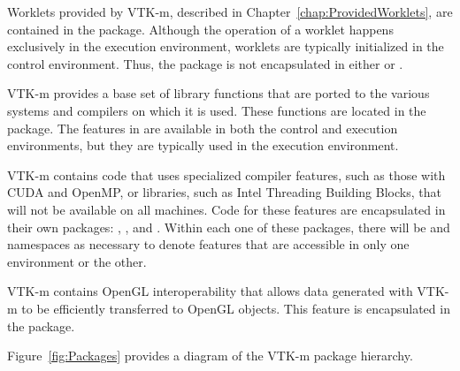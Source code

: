 
Worklets provided by VTK-m, described in
Chapter~\ref{chap:ProvidedWorklets}, are contained in the \vtkmworklet{}
package. Although the operation of a worklet happens exclusively in the
execution environment, worklets are typically initialized in the control
environment. Thus, the \vtkmworklet{} package is not encapsulated in either
\vtkmcont{} or \vtkmexec{}.

VTK-m provides a base set of library functions that are ported to
the various systems and compilers on which it is used. These functions are
located in the \vtkmmath{} package. The features in \vtkmmath{} are available
in both the control and execution environments, but they are typically used
in the execution environment.

VTK-m contains code that uses specialized compiler features, such as those
with CUDA and OpenMP, or libraries, such as Intel Threading Building
Blocks, that will not be available on all machines. Code for these features
are encapsulated in their own packages: \vtkmcuda{}, \vtkmopenmp{}, and
\vtkmtbb{}. Within each one of these packages, there will
be  and  namespaces as necessary to
denote features that are accessible in only one environment or the
other. 

VTK-m contains OpenGL interoperability 
 that allows data generated with VTK-m to be
efficiently transferred to OpenGL objects. This feature is encapsulated in
the \vtkmopengl{} package.

Figure~\ref{fig:Packages} provides a diagram of the VTK-m package hierarchy.

